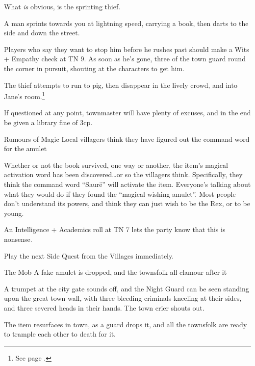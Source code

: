 \begin{multicols}{2}
What \emph{is} obvious, is the sprinting thief.

\begin{boxtext}

	A man sprints towards you at lightning speed, carrying a book, then darts to the side and down the street.

\end{boxtext}

Players who say they want to stop him before he rushes past should make a Wits + Empathy check at TN 9.
As soon as he's gone, three of the town guard round the corner in pursuit, shouting at the characters to get him.

The thief attempts to run to \gls{pig}, then disappear in the lively crowd, and into Jane's room.\footnote{See page \pageref{priestessjane}.}


If questioned at any point, \gls{townmaster} will have plenty of excuses, and in the end be given a library fine of 3cp.

{Rumours of Magic}%
{Local villagers think they have figured out the command word for the amulet}%

Whether or not the book survived, one way or another, the item's magical activation word has been discovered\ldots or so the villagers think.
Specifically, they think the command word ``Saur\"{e}'' will activate the item.
Everyone's talking about what they would do if they found the ``magical wishing amulet''.
Most people don't understand its powers, and think they can just wish to be the Rex, or to be young.

An Intelligence + Academics roll at TN 7 lets the party know that this is nonsense.

Play the next Side Quest from the Villages immediately.

{The Mob}%
{A fake amulet is dropped, and the townsfolk all clamour after it}%

\begin{boxtext}

	A trumpet at the city gate sounds off, and the Night Guard can be seen standing upon the great town wall, with three bleeding criminals kneeling at their sides, and three severed heads in their hands.  The town crier shouts out.

\end{boxtext}

The item resurfaces in town, as a guard drops it, and all the townsfolk are ready to trample each other to death for it.


\end{multicols}
